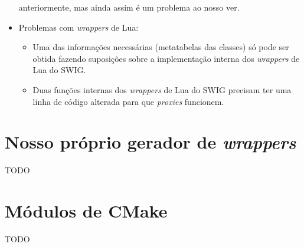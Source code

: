 \begin{itemize}
      anteriormente, mas ainda assim é um problema ao nosso ver.
    \item Problemas com \textit{wrappers} de Lua:
      \begin{itemize}
        \item Uma das informações necessárias (metatabelas das classes) só pode ser obtida
          fazendo suposições sobre a implementação interna dos \textit{wrappers} de Lua do SWIG.
        \item Duas funções internas dos \textit{wrappers} de Lua do SWIG precisam ter uma linha
          de código alterada para que \textit{proxies} funcionem.
      \end{itemize}
  \end{itemize}
  
  \section{Nosso próprio gerador de \emph{wrappers}}
  
  TODO
  
  \section{Módulos de CMake}
  
  TODO
